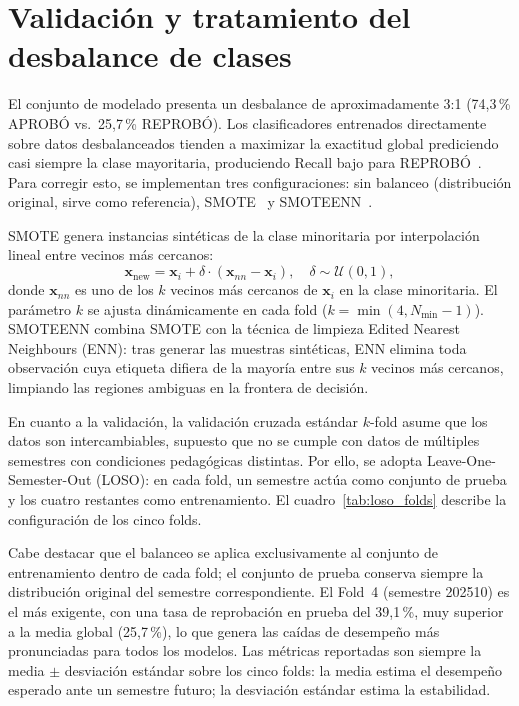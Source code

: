 \documentclass[12pt, letterpaper, openany]{report}
\begin{document}
\section{Validación y tratamiento del desbalance de clases}

El conjunto de modelado presenta un desbalance de aproximadamente 3:1 
(74,3\,\% APROBÓ vs.\ 25,7\,\% REPROBÓ). Los clasificadores entrenados 
directamente sobre datos desbalanceados tienden a maximizar la exactitud 
global prediciendo casi siempre la clase mayoritaria, produciendo Recall 
bajo para REPROBÓ~\cite{He2009}. Para corregir esto, se implementan tres 
configuraciones: sin balanceo (distribución original, sirve como 
referencia), SMOTE~\cite{Chawla2002} y SMOTEENN~\cite{Batista2004}.

SMOTE genera instancias sintéticas de la clase minoritaria por 
interpolación lineal entre vecinos más cercanos:
\begin{equation}
  \mathbf{x}_\text{new} = \mathbf{x}_i + \delta \cdot 
  (\mathbf{x}_{nn} - \mathbf{x}_i), \quad \delta \sim \mathcal{U}(0,1),
\end{equation}
donde $\mathbf{x}_{nn}$ es uno de los $k$ vecinos más cercanos de 
$\mathbf{x}_i$ en la clase minoritaria. El parámetro $k$ se ajusta 
dinámicamente en cada fold ($k = \min(4, N_\text{min} - 1)$). 
SMOTEENN combina SMOTE con la técnica de limpieza Edited Nearest 
Neighbours (ENN): tras generar las muestras sintéticas, ENN elimina 
toda observación cuya etiqueta difiera de la mayoría entre sus $k$ 
vecinos más cercanos, limpiando las regiones ambiguas en la frontera 
de decisión.

En cuanto a la validación, la validación cruzada estándar $k$-fold 
asume que los datos son intercambiables, supuesto que no se cumple 
con datos de múltiples semestres con condiciones pedagógicas distintas. 
Por ello, se adopta Leave-One-Semester-Out (LOSO): en cada fold, un 
semestre actúa como conjunto de prueba y los cuatro restantes como 
entrenamiento. El cuadro~\ref{tab:loso_folds} describe la configuración 
de los cinco folds.

Cabe destacar que el balanceo se aplica exclusivamente al conjunto de 
entrenamiento dentro de cada fold; el conjunto de prueba conserva 
siempre la distribución original del semestre correspondiente. El 
Fold~4 (semestre 202510) es el más exigente, con una tasa de 
reprobación en prueba del 39,1\,\%, muy superior a la media global 
(25,7\,\%), lo que genera las caídas de desempeño más pronunciadas 
para todos los modelos. Las métricas reportadas son siempre la media 
$\pm$ desviación estándar sobre los cinco folds: la media estima el 
desempeño esperado ante un semestre futuro; la desviación estándar 
estima la estabilidad.
\end{document}
